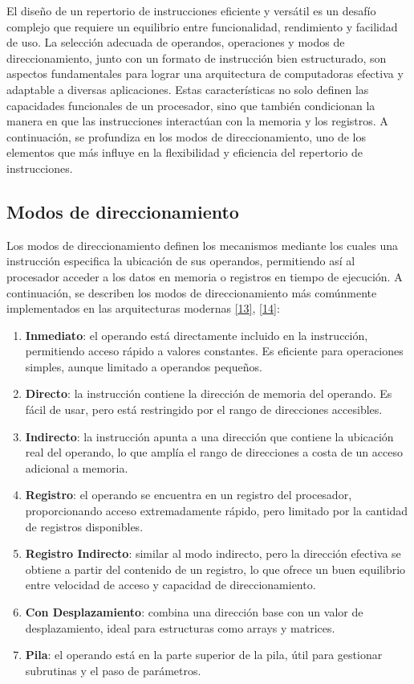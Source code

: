 \documentclass[12pt,oneside]{templates/unerthesis}
\providecommand{\tightlist}{%
  \setlength{\itemsep}{0pt}\setlength{\parskip}{0pt}}
\begin{document}
El diseño de un repertorio de instrucciones eficiente y versátil es un desafío complejo que requiere un equilibrio entre funcionalidad, rendimiento y facilidad de uso. La selección adecuada de operandos, operaciones y modos de direccionamiento, junto con un formato de instrucción bien estructurado, son aspectos fundamentales para lograr una arquitectura de computadoras efectiva y adaptable a diversas aplicaciones. Estas características no solo definen las capacidades funcionales de un procesador, sino que también condicionan la manera en que las instrucciones interactúan con la memoria y los registros. A continuación, se profundiza en los modos de direccionamiento, uno de los elementos que más influye en la flexibilidad y eficiencia del repertorio de instrucciones.

\hypertarget{modos-de-direccionamiento}{%
\subsection{Modos de direccionamiento}\label{modos-de-direccionamiento}}

Los modos de direccionamiento definen los mecanismos mediante los cuales una instrucción especifica la ubicación de sus operandos, permitiendo así al procesador acceder a los datos en memoria o registros en tiempo de ejecución. A continuación, se describen los modos de direccionamiento más comúnmente implementados en las arquitecturas modernas \protect\hyperlink{ref-hennessy2017computer}{{[}13{]}}, \protect\hyperlink{ref-stallings_computer_2021}{{[}14{]}}:

\begin{enumerate}
\def\labelenumi{\alph{enumi})}
\tightlist
\item
  \textbf{Inmediato}: el operando está directamente incluido en la instrucción, permitiendo acceso rápido a valores constantes. Es eficiente para operaciones simples, aunque limitado a operandos pequeños.
\item
  \textbf{Directo}: la instrucción contiene la dirección de memoria del operando. Es fácil de usar, pero está restringido por el rango de direcciones accesibles.
\item
  \textbf{Indirecto}: la instrucción apunta a una dirección que contiene la ubicación real del operando, lo que amplía el rango de direcciones a costa de un acceso adicional a memoria.
\item
  \textbf{Registro}: el operando se encuentra en un registro del procesador, proporcionando acceso extremadamente rápido, pero limitado por la cantidad de registros disponibles.
\item
  \textbf{Registro Indirecto}: similar al modo indirecto, pero la dirección efectiva se obtiene a partir del contenido de un registro, lo que ofrece un buen equilibrio entre velocidad de acceso y capacidad de direccionamiento.
\item
  \textbf{Con Desplazamiento}: combina una dirección base con un valor de desplazamiento, ideal para estructuras como arrays y matrices.
\item
  \textbf{Pila}: el operando está en la parte superior de la pila, útil para gestionar subrutinas y el paso de parámetros.
\end{enumerate}
\end{document}
